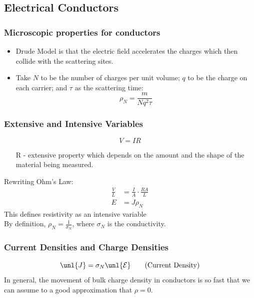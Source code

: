 \documentclass[a4paper, 11pt, normalem]{report}
\newcommand\E{\mathcal{E}}
\newcommand\uE{\unl{\E}}
\newcommand\J{\unl{J}}
\begin{document}
\subsection{Electrical Conductors}
\subsubsection{Microscopic properties for conductors}
\begin{itemize}
    \item Drude Model is that the electric field accelerates the charges which then collide with the scattering sites.
    \item Take $N$ to be the number of charges per unit volume; $q$ to be the charge on each carrier; and $\tau$ as the scattering time:
    \begin{equation*}
        \rho_N = \frac{m}{Nq^2\tau}
    \end{equation*}
\end{itemize}

\subsubsection{Extensive and Intensive Variables}
\begin{equation}
    V = IR \tag{Ohm's Law}
\end{equation}
\begin{itemize}
    \item[R] - extensive property which depends on the amount and the shape of the material being measured.
\end{itemize}
Rewriting Ohm's Law:
\begin{align*}
    \frac{V}{L} &= \frac{I}{A} \cdot \frac{RA}{L} \\
    E &= J \rho_N
\end{align*}
This defines resistivity as an intensive variable \\
By definition, $\rho_N = \frac{1}{\sigma_N}$, where $\sigma_N$ is the conductivity.

\subsubsection{Current Densities and Charge Densities}
\begin{equation}
    \J = \sigma_N \uE \tag{Current Density}
\end{equation}
In general, the movement of bulk charge density in conductors is so fast that we can assume to a good approximation that $\rho = 0.$
\end{document}
